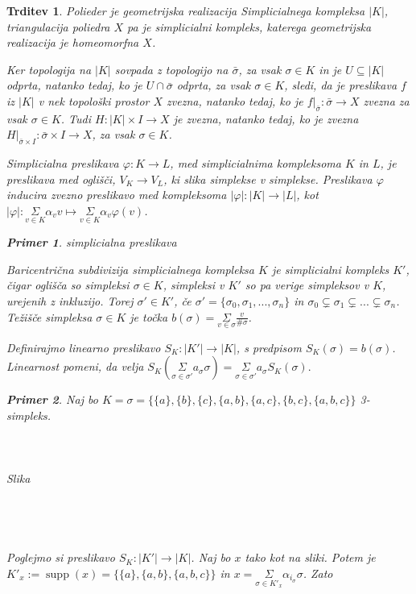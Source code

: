 \documentclass[a4paper,12pt]{article}
\DeclareRobustCommand{\si}{
    \bar{\sigma}
}
\DeclareMathOperator*{\supp}{supp}
\theoremstyle{definition}
\theoremstyle{plain}
\theoremstyle{definition}
\newtheorem{primer}{Primer}
\theoremstyle{plain}
\newtheorem{trditev}{Trditev}
\theoremstyle{plain}
\theoremstyle{plain}
\theoremstyle{plain}
\begin{document}
\begin{trditev}
\textit{Polieder} je geometrijska realizacija Simplicialnega kompleksa $|K|$, \textit{triangulacija} poliedra $X$ pa je simplicialni kompleks, katerega geometrijska realizacija je homeomorfna $X$.

Ker topologija na $|K|$ sovpada z topologijo na $\bar{\sigma}$, za vsak $\sigma\in K$ in je $U \subseteq |K|$ odprta, natanko tedaj, ko je $U \cap 
\si$ odprta, za vsak $\sigma \in K$, sledi, da je preslikava $f$ iz $|K|$ v nek topološki prostor $X$ zvezna, natanko tedaj, ko je $f|_{\bar{\sigma}}: \bar{\sigma} \rightarrow X$ zvezna za vsak $\sigma\in K$. Tudi $H:|K|\times I \rightarrow X$ je zvezna, natanko tedaj, ko je zvezna $H|_{\si\times I}:\si\times I \rightarrow X$, za vsak $\sigma\in K$.


\textit{Simplicialna preslikava} $\varphi :K \rightarrow L$, med 
simplicialnima kompleksoma $K$ in $L$, je preslikava med 
oglišči, $V_K \rightarrow V_L$, ki slika simplekse v 
simplekse. Preslikava $\varphi$ inducira zvezno preslikavo med 
kompleksoma $|\varphi| :|K| \rightarrow |L|$, kot $|\varphi|:
\underset{v \in K}{\Sigma}\alpha_v v \mapsto
\underset{v \in K}{\Sigma}\alpha_v \varphi(v)$.

\begin{primer}
    simplicialna preslikava
\end{primer}
    
\textit{Baricentrična subdivizija} simplicialnega kompleksa 
$K$ je simplicialni kompleks $K'$, čigar oglišča so 
simpleksi $\sigma \in K$, simpleksi v $K'$ so pa verige 
simpleksov v $K$, urejenih z inkluzijo. Torej $\sigma' \in K'$, če $\sigma' = \{\sigma_0, \sigma_1,...,\sigma_n\}$ in $\sigma_0\subsetneq \sigma_1\subsetneq...\subsetneq\sigma_n$. \textit{Težišče} simpleksa $\sigma \in K$ je točka $b(\sigma)=\underset{v\in \sigma}{\Sigma} \frac{v}{\#\sigma}$.

Definirajmo linearno preslikavo $S_K: |K'| \rightarrow |K|$, s predpisom $S_K(\sigma) = b(\sigma)$. Linearnost pomeni, da velja $S_K(\underset{\sigma\in \sigma'}{\Sigma} a_\sigma \sigma) =  \underset{\sigma\in \sigma'}{\Sigma} a_\sigma S_K(\sigma).$

\begin{primer}
Naj bo $K=\sigma=\{\{a\},\{b\},\{c\},\{a,b\},\{a,c\},\{b,c\},\{a,b,c\}\}$ 3-simpleks.
\\
\\
\\
\\
Slika
\\
\\
\\
\\
\\
Poglejmo si preslikavo $S_K: |K'| \rightarrow |K|$. Naj bo $x$ tako kot na sliki. %
Potem je 
$K'_x:=\supp(x)=\{\{a\},\{a,b\},\{a,b,c\}\}$ in $x= \underset{\sigma\in K'_x}{\Sigma} \alpha_{i_\sigma} \sigma$. Zato


\end{primer}
\end{trditev}
\end{document}
